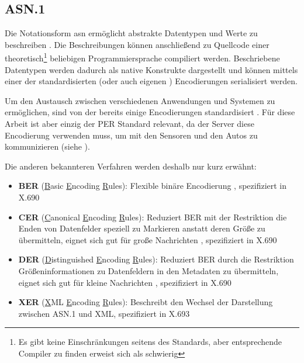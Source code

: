 
\subsection{ASN.1}

Die Notationsform \gls{asn} ermöglicht abstrakte Datentypen und Werte zu beschreiben \cite{asn:layman}.
Die Beschreibungen können anschließend zu Quellcode einer theoretisch\footnote{Es gibt keine Einschränkungen seitens des Standards, aber entsprechende Compiler zu finden erweist sich als schwierig } beliebigen Programmiersprache compiliert werden.
Beschriebene Datentypen werden dadurch als native Konstrukte dargestellt und können mittels einer der standardisierten (oder auch eigenen \cite{asn:itu:ecn}) Encodierungen serialisiert werden.

Um den Austausch zwischen verschiedenen Anwendungen und Systemen zu ermöglichen, sind von der  bereits einige Encodierungen standardisiert \cite[8]{asn:itu:x691}.
Für diese Arbeit ist aber einzig der PER Standard relevant, da der Server diese Encodierung verwenden muss, um mit den Sensoren und den Autos zu kommunizieren (siehe ).

Die anderen bekannteren Verfahren werden deshalb nur kurz erwähnt:
\begin{itemize}
	\item \textbf{BER} (\underline{B}asic \underline{E}ncoding \underline{R}ules): Flexible binäre Encodierung \cite{asn:wiki:x690}, spezifiziert in X.690 \cite{asn:itu:x690}
	\item \textbf{CER} (\underline{C}anonical \underline{E}ncoding \underline{R}ules): Reduziert BER mit der Restriktion die Enden von Datenfelder speziell zu Markieren anstatt deren Größe zu übermitteln, eignet sich gut für große Nachrichten \cite{asn:wiki:x690}, spezifiziert in X.690 \cite{asn:itu:x690}
	\item \textbf{DER} (\underline{D}istinguished \underline{E}ncoding \underline{R}ules): Reduziert BER durch die Restriktion Größeninformationen zu Datenfeldern in den Metadaten zu übermitteln, eignet sich gut für kleine Nachrichten \cite{asn:wiki:x690}, spezifiziert in X.690 \cite{asn:itu:x690}
	\item \textbf{XER} (\underline{X}ML \underline{E}ncoding \underline{R}ules): Beschreibt den Wechsel der Darstellung zwischen ASN.1 und XML, spezifiziert in X.693 \cite{asn:itu:x693}
\end{itemize}

